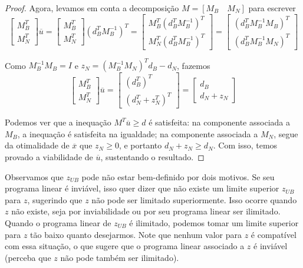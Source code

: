 \documentclass[]{article}
\numberwithin{equation}{section}
\begin{document}
\begin{proof}
  Agora, levamos em conta a decomposição $M = [M_B \quad M_N]$ para escrever
  $$
  \begin{bmatrix}
  M_B^T \\
  M_N^T
  \end{bmatrix}
  \overline{u}
  =
  \begin{bmatrix}
  M_B^T \\
  M_N^T
  \end{bmatrix}
  (d_B^TM_B^{-1})^T
  =
  \begin{bmatrix}
  M_B^T(d_B^TM_B^{-1})^T \\
  M_N^T(d_B^TM_B^{-1})^T
  \end{bmatrix}
  =
  \begin{bmatrix}
  (d_B^TM_B^{-1}M_B)^T \\
  (d_B^TM_B^{-1}M_N)^T
  \end{bmatrix}
  $$

  Como $M_B^{-1}M_B = I$ e $z_N = (M_B^{-1}M_N)^Td_B - d_N$, fazemos
  $$
  \begin{bmatrix}
  M_B^T \\
  M_N^T
  \end{bmatrix}
  \overline{u}
  =
  \begin{bmatrix}
  (d_B^T)^T \\
  (d_N^T + z_N^T)^T
  \end{bmatrix}
  =
  \begin{bmatrix}
  d_B \\
  d_N + z_N
  \end{bmatrix}
  $$

  Podemos ver que a inequação $M^T\overline{u} \geq d$ é satisfeita: na componente associada a $M_B$, a
  inequação é satisfeita na igualdade; na componente associada a $M_N$, segue da otimalidade de
  $\overline{x}$ que $z_N \geq 0$, e portanto $d_N + z_N \geq d_N$.
  Com isso, temos provado a viabilidade de $\overline{u}$, sustentando o resultado.
\end{proof}

Observamos que $z_{UB}$ pode não estar bem-definido por dois motivos.
Se seu programa linear é inviável, isso quer dizer que não existe um limite superior $z_{UB}$ para $z$,
sugerindo que $z$ não pode ser limitado superiormente.
Isso ocorre quando $z$ não existe, seja por inviabilidade ou por seu programa linear ser ilimitado.
Quando o programa linear de $z_{UB}$ é ilimitado, podemos tomar um limite superior para $z$ tão baixo
quanto desejarmos.
Note que nenhum valor para $z$ é compatível com essa situação, o que sugere que o programa linear
associado a $z$ é inviável (perceba que $z$ não pode também ser ilimitado).
\end{document}
